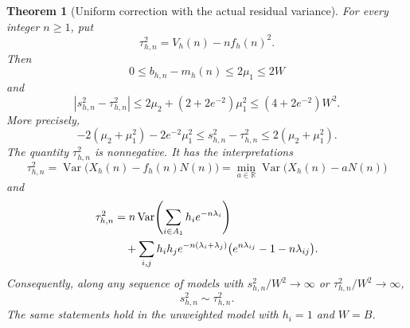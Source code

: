 \documentclass[11pt]{article}
\numberwithin{equation}{section}
\newtheorem{theorem}{Theorem}[section]
\theoremstyle{remark}
\newcommand{\Var}{\operatorname{Var}}
\begin{document}
\begin{theorem}[Uniform correction with the actual residual variance]
\label{thm:uniform-correction}
For every integer $n\ge1$, put
\begin{equation}\label{eq:tau-definition}
 \tau_{h,n}^2=V_h(n)-n f_h(n)^2.
\end{equation}
Then
\begin{equation}\label{eq:uniform-mean-correction}
 0\le b_{h,n}-m_h(n)\le2\mu_1\le2W
\end{equation}
and
\begin{equation}\label{eq:uniform-variance-correction}
 \left|s_{h,n}^2-\tau_{h,n}^2\right|
 \le2\mu_2+(2+2e^{-2})\mu_1^2
 \le(4+2e^{-2})W^2.
\end{equation}
More precisely,
\begin{equation}\label{eq:uniform-asymmetric-correction}
 -2(\mu_2+\mu_1^2)-2e^{-2}\mu_1^2
 \le s_{h,n}^2-\tau_{h,n}^2
 \le2(\mu_2+\mu_1^2).
\end{equation}
The quantity $\tau_{h,n}^2$ is nonnegative. It has the interpretations
\begin{equation}\label{eq:tau-projection}
 \tau_{h,n}^2
 =\Var\bigl(X_h(n)-f_h(n)N(n)\bigr)
 =\min_{a\in\mathbb R}\Var\bigl(X_h(n)-aN(n)\bigr)
\end{equation}
and
\begin{align}
 \tau_{h,n}^2
 &=n\Var\!\left(\sum_{i\in A_1}h_i e^{-n\lambda_i}\right)\notag\\
 &\quad+\sum_{i,j}h_i h_j e^{-n(\lambda_i+\lambda_j)}
       \bigl(e^{n\lambda_{ij}}-1-n\lambda_{ij}\bigr).
 \label{eq:tau-positive}
\end{align}
Consequently, along any sequence of models with
$s_{h,n}^2/W^2\to\infty$ or $\tau_{h,n}^2/W^2\to\infty$,
\[
 s_{h,n}^2\sim\tau_{h,n}^2.
\]
The same statements hold in the unweighted model with $h_i=1$ and $W=B$.
\end{theorem}
\end{document}

